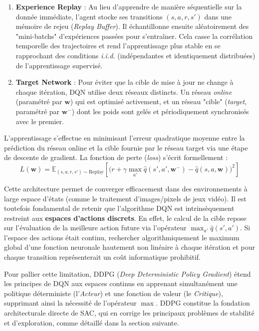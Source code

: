 \begin{enumerate}
    \item \textbf{Experience Replay} : Au lieu d'apprendre de manière séquentielle sur la donnée immédiate, l'agent stocke ses transitions $(s, a, r, s')$ dans une mémoire de rejeu (\textit{Replay Buffer}). Il échantillonne ensuite aléatoirement des "mini-batchs" d'expériences passées pour s'entraîner. Cela casse la corrélation temporelle des trajectoires et rend l'apprentissage plus stable en se rapprochant des conditions \textit{i.i.d.} (indépendantes et identiquement distribuées) de l'apprentissage supervisé.
    \item \textbf{Target Network} : Pour éviter que la cible de mise à jour ne change à chaque itération, DQN utilise deux réseaux distincts. Un réseau \textit{online} (paramétré par $\mathbf{w}$) qui est optimisé activement, et un réseau "cible" (\textit{target}, paramétré par $\mathbf{w}^-$) dont les poids sont gelés et périodiquement synchronisés avec le premier.
\end{enumerate}

L'apprentissage s'effectue en minimisant l'erreur quadratique moyenne entre la prédiction du réseau online et la cible fournie par le réseau target via une étape de descente de gradient. La fonction de perte (\textit{loss}) s'écrit formellement :
\begin{equation}
    L(\mathbf{w}) = \mathbb{E}_{(s,a,r,s') \sim \text{Replay}} \left[ \Big(r + \gamma \max_{a'} \hat{q}(s', a', \mathbf{w}^-) - \hat{q}(s, a, \mathbf{w})\Big)^2 \right]
\end{equation}

Cette architecture permet de converger efficacement dans des environnements à large espace d'états (comme le traitement d'images/pixels de jeux vidéo). 
Il est toutefois fondamental de retenir que l'algorithme DQN est intrinsèquement restreint aux \textbf{espaces d'actions discrets}. En effet, le calcul de la cible repose sur l'évaluation de la meilleure action future via l'opérateur $\max_{a'} \hat{q}(s', a')$. Si l'espace des actions était continu, rechercher algorithmiquement le maximum global d'une fonction neuronale hautement non linéaire à chaque itération et pour chaque transition représenterait un coût informatique prohibitif.

Pour pallier cette limitation, DDPG (\textit{Deep Deterministic Policy Gradient}) \parencite{lillicrapContinuousControlDeep2015} étend les principes de DQN aux espaces continus en apprenant simultanément une politique déterministe (l'\textit{Acteur}) et une fonction de valeur (le \textit{Critique}), supprimant ainsi la nécessité de l'opérateur $\max$. DDPG constitue la fondation architecturale directe de SAC, qui en corrige les principaux problèmes de stabilité et d'exploration, comme détaillé dans la section suivante.


